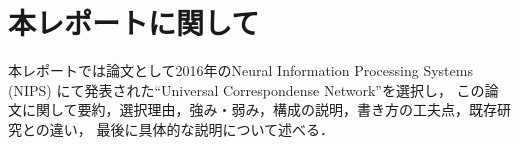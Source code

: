 \section{本レポートに関して}

本レポートでは論文として2016年のNeural Information Processing Systems (NIPS)
にて発表された``Universal Correspondense Network''\cite{choy_nips16}を選択し，
この論文に関して要約，選択理由，強み・弱み，構成の説明，書き方の工夫点，既存研究との違い，
最後に具体的な説明について述べる．

